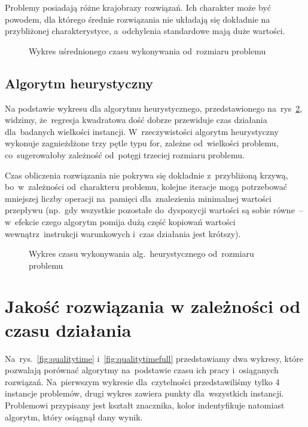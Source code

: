 \documentclass[a4paper,10pt]{article}
\begin{document}
Problemy posiadają różne krajobrazy rozwiązań.
Ich charakter może być powodem, dla którego średnie rozwiązania nie układają się dokładnie na przybliżonej charakterystyce,
a~odchylenia standardowe mają duże wartości.

\begin{figure}[!htpb]
\begin{center}

\caption{Wykres uśrednionego czasu wykonywania od~rozmiaru problemu}
\label{fig:timesize}
\end{center}
\end{figure}

\subsection{Algorytm heurystyczny}
Na podstawie wykresu dla algorytmu heurystycznego, przedstawionego na~rys~\ref{fig:timesizeheuristic},
widzimy, że~regresja kwadratowa dość dobrze przewiduje czas działania dla~badanych wielkości instancji.
W~rzeczywistości algorytm heurystyczny wykonuje zagnieżdżone trzy pętle typu for, zależne od~wielkości problemu,
co~sugerowałoby zależność od~potęgi trzeciej rozmiaru problemu.

Czas obliczenia rozwiązania nie pokrywa się dokładnie z~przybliżoną krzywą, bo~w~zależności od~charakteru problemu,
kolejne iteracje mogą potrzebować mniejszej liczby operacji na~pamięci dla~znalezienia minimalnej wartości przepływu
(np.~gdy wszystkie pozostałe do~dyspozycji wartości są sobie równe~-- w~efekcie czego algorytm pomija dużą część kopiowań
wartości wewnątrz~instrukcji warunkowych i~czas działania jest krótszy).

\begin{figure}[!htpb]
\begin{center} 

\caption{Wykres czasu wykonywania alg.~heurystycznego od~rozmiaru problemu}
\label{fig:timesizeheuristic}
\end{center}
\end{figure}

%

\section{Jakość rozwiązania w zależności od czasu działania}
Na~rys.~\ref{fig:qualitytime} i~\ref{fig:qualitytimefull} przedstawiamy dwa wykresy,
które pozwalają porównać algorytmy na~podstawie czasu ich pracy i~osiąganych rozwiązań.
Na~pierwszym wykresie dla~czytelności przedstawiliśmy tylko 4 instancje problemów, drugi wykres zawiera punkty dla~wszystkich instancji. 
Problemowi przypisany jest kształt znacznika, kolor indentyfikuje natomiast algorytm, który osiągnął dany wynik.
\end{document}
